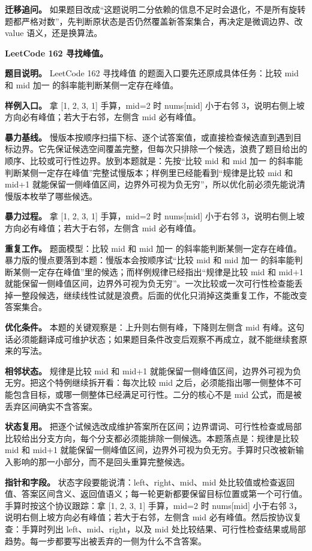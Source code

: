 \textbf{迁移追问。} 如果题目改成“这题说明二分依赖的信息不足时会退化，不是所有旋转题都严格对数”，先判断原状态是否仍然覆盖新答案集合，再决定是微调边界、改 value 语义，还是换算法。

\noindent\textbf{LeetCode 162 寻找峰值。}

\textbf{题目说明。} LeetCode 162 寻找峰值 的题面入口要先还原成具体任务：比较 mid 和 mid 加一 的斜率能判断某侧一定存在峰值。

\textbf{样例入口。} 拿 [1, 2, 3, 1] 手算，mid=2 时 nums[mid] 小于右邻 3，说明右侧上坡方向必有峰值；若大于右邻，左侧含 mid 必有峰值。

\textbf{暴力基线。} 慢版本按顺序扫描下标、逐个试答案值，或直接检查候选直到遇到目标边界。它先保证候选空间覆盖完整，但每次只排除一个候选，浪费了题目给出的顺序、比较或可行性边界。放到本题就是：先按“比较 mid 和 mid 加一 的斜率能判断某侧一定存在峰值”完整试慢版本；样例里已经能看到“规律是比较 mid 和 mid+1 就能保留一侧峰值区间，边界外可视为负无穷”，所以优化前必须先能说清慢版本枚举了哪些候选。

\textbf{暴力过程。} 拿 [1, 2, 3, 1] 手算，mid=2 时 nums[mid] 小于右邻 3，说明右侧上坡方向必有峰值；若大于右邻，左侧含 mid 必有峰值。

\textbf{重复工作。} 题面模型：比较 mid 和 mid 加一 的斜率能判断某侧一定存在峰值。暴力版的慢点要落到本题：慢版本会按顺序试“比较 mid 和 mid 加一 的斜率能判断某侧一定存在峰值”里的候选；而样例规律已经指出“规律是比较 mid 和 mid+1 就能保留一侧峰值区间，边界外可视为负无穷”。一次比较或一次可行性检查能丢掉一整段候选，继续线性试就是浪费。后面的优化只消掉这类重复工作，不能改变答案集合。

\textbf{优化条件。} 本题的关键观察是：上升则右侧有峰，下降则左侧含 mid 有峰。这句话必须能翻译成可维护状态；如果题目条件改变后观察不再成立，就不能继续套原来的写法。

\textbf{相邻状态。} 规律是比较 mid 和 mid+1 就能保留一侧峰值区间，边界外可视为负无穷。把这个特例继续拆开看：每次比较 mid 之后，必须能指出哪一侧整体不可能包含目标，或哪一侧整体已经满足可行性。二分的核心不是 mid 公式，而是被丢弃区间确实不含答案。

\textbf{状态复用。} 把逐个试候选改成维护答案所在区间；边界谓词、可行性检查或局部比较给出分支方向，每个分支都必须能排除一侧候选。本题落点是：规律是比较 mid 和 mid+1 就能保留一侧峰值区间，边界外可视为负无穷。手算时只改被新输入影响的那一小部分，而不是回头重算完整候选。

\textbf{指针和字段。} 状态字段要能说清：left、right、mid、mid 处比较值或检查返回值、答案区间含义、返回值语义；每一轮更新都要保留目标位置或第一个可行值。手算时按这个协议跟踪：拿 [1, 2, 3, 1] 手算，mid=2 时 nums[mid] 小于右邻 3，说明右侧上坡方向必有峰值；若大于右邻，左侧含 mid 必有峰值。然后按协议复查：手算时列出 left、mid、right，以及 mid 处比较结果、可行性检查结果或局部趋势。每一步都要写出被丢弃的一侧为什么不含答案。

